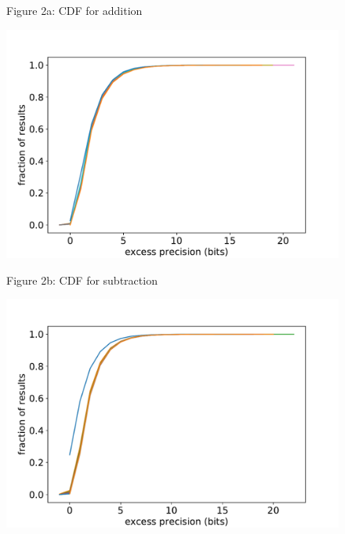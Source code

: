 \documentclass[letterpaper,10pt]{article}
\begin{document}
\begin{figure}
\hspace{-.2\textwidth}
\begin{minipage}{1.2\textwidth}

 \begin{minipage}{0.6\textwidth}
  \begin{center} Figure 2a: CDF for addition \end{center} \vspace{-10pt}
  \includegraphics[width=1.0\textwidth]{add_cdf.pdf}
 \end{minipage}
 \begin{minipage}{0.6\textwidth}
  \begin{center} Figure 2b: CDF for subtraction \end{center} \vspace{-10pt}
  \includegraphics[width=1.0\textwidth]{sub_cdf.pdf}
 \end{minipage}
 

\end{minipage}
\end{figure}
\end{document}
